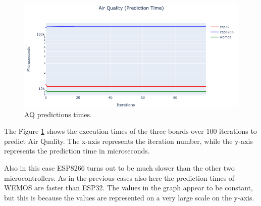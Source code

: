 \documentclass{article}
\begin{document}
\begin{minipage}{0.69\textwidth}
    \begin{figure}[H]
        \centering
        \includegraphics[scale=0.45]{AQ-PredictionsTimes.png}
        \caption{AQ predictions times.}
        \label{fig:8}
    \end{figure}
\end{minipage}
\hfill
\begin{minipage}{0.3\textwidth}
    \begin{table}[H]
        \caption{AQ descriptive statistics.}       
        \centering
        \label{tab:4}
    \end{table}
\end{minipage}
\break

The Figure \ref{fig:8} shows the execution times of the three boards over 100 iterations to predict Air Quality. The x-axis represents the iteration number, while the y-axis represents the prediction time in microseconds. 

Also in this case ESP8266 turns out to be much slower than the other two microcontrollers. As in the previous cases also here the prediction times of WEMOS are faster than ESP32. The values in the graph appear to be constant, but this is because the values are represented on a very large scale on the y-axis.
\end{document}
